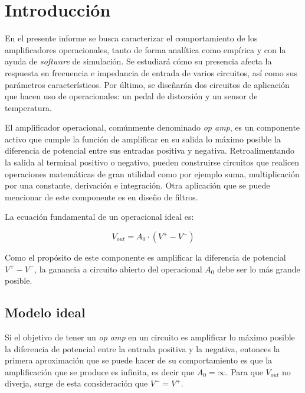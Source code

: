 \documentclass[main.tex]{subfiles}
\begin{document}
\section{Introducci\'on}

En el presente informe se busca caracterizar el comportamiento de los amplificadores operacionales, tanto de forma anal\'itica como emp\'irica y con la ayuda de \textit{software} de simulaci\'on. Se estudiar\'a c\'omo su presencia afecta la respuesta en frecuencia e impedancia de entrada de varios circuitos, as\'i como sus par\'ametros caracter\'isticos. Por \'ultimo, se dise\~nar\'an dos circuitos de aplicaci\'on que hacen uso de operacionales: un pedal de distorsi\'on y un sensor de temperatura. \par

El amplificador operacional, com\'unmente denominado \textit{op amp}, es un componente activo que cumple la funci\'on de amplificar en su salida lo m\'aximo posible la diferencia de potencial entre sus entradas positiva y negativa. Retroalimentando la salida al terminal positivo o negativo, pueden construirse circuitos que realicen operaciones matem\'aticas de gran utilidad como por ejemplo suma, multiplicaci\'on por una constante, derivaci\'on e integraci\'on. Otra aplicaci\'on que se puede mencionar de este componente es en dise\~no de filtros. \par


La ecuaci\'on fundamental de un operacional ideal es:

\[ V_{out} = A_0 \cdot (V^+ - V^-) \]

Como el prop\'osito de este componente es amplificar la diferencia de potencial $V^+ - V^-$, la ganancia a circuito abierto del operacional $A_0$ debe ser lo m\'as grande posible.


\subsection{Modelo ideal}
Si el objetivo de tener un \textit{op amp} en un circuito es amplificar lo m\'aximo posible la diferencia de potencial entre la entrada positiva y la negativa, entonces la primera aproximaci\'on que se puede hacer de su comportamiento es que la amplificaci\'on que se produce es infinita, es decir que $A_0=\infty$. Para que $V_{out}$ no diverja, surge de esta consideraci\'on que $V^- = V^+$. \par
\end{document}
